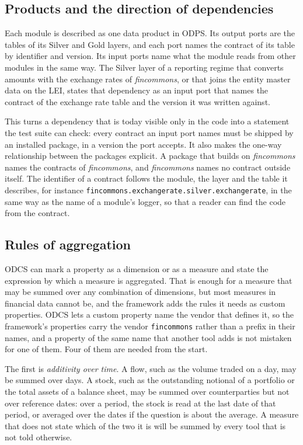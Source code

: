 \documentclass[a4paper, 11pt]{report}
\begin{document}
\subsection{Products and the direction of dependencies}

Each module is described as one data product in ODPS. Its output ports are the tables of its Silver and Gold layers, and each port names the contract of its table by identifier and version. Its input ports name what the module reads from other modules in the same way. The Silver layer of a reporting regime that converts amounts with the exchange rates of \emph{fincommons}, or that joins the entity master data on the LEI, states that dependency as an input port that names the contract of the exchange rate table and the version it was written against.

This turns a dependency that is today visible only in the code into a statement the test suite can check: every contract an input port names must be shipped by an installed package, in a version the port accepts. It also makes the one-way relationship between the packages explicit. A package that builds on \emph{fincommons} names the contracts of \emph{fincommons}, and \emph{fincommons} names no contract outside itself. The identifier of a contract follows the module, the layer and the table it describes, for instance \verb|fincommons.exchangerate.silver.exchangerate|, in the same way as the name of a module's logger, so that a reader can find the code from the contract.

\subsection{Rules of aggregation}

ODCS can mark a property as a dimension or as a measure and state the expression by which a measure is aggregated. That is enough for a measure that may be summed over any combination of dimensions, but most measures in financial data cannot be, and the framework adds the rules it needs as custom properties. ODCS lets a custom property name the vendor that defines it, so the framework's properties carry the vendor \verb|fincommons| rather than a prefix in their names, and a property of the same name that another tool adds is not mistaken for one of them. Four of them are needed from the start.

The first is \emph{additivity over time}. A flow, such as the volume traded on a day, may be summed over days. A stock, such as the outstanding notional of a portfolio or the total assets of a balance sheet, may be summed over counterparties but not over reference dates: over a period, the stock is read at the last date of that period, or averaged over the dates if the question is about the average. A measure that does not state which of the two it is will be summed by every tool that is not told otherwise.
\end{document}
